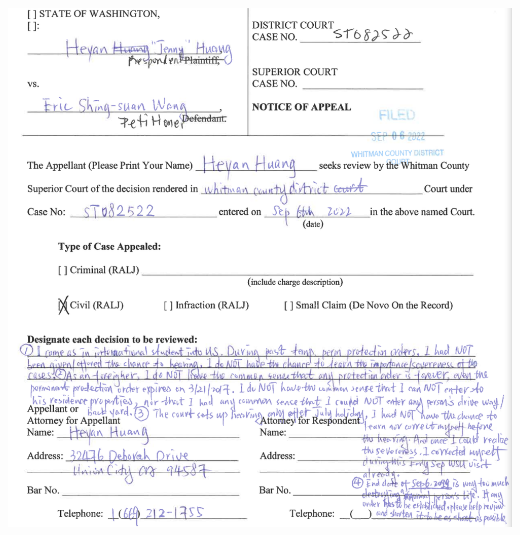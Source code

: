 \documentclass[9pt, b5paper]{article}
\begin{document}
\includegraphics[width=.9\linewidth]{./pic/dearCousin_20220919_222530.png}
\end{document}
